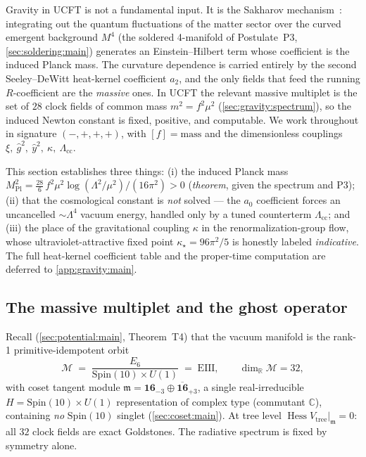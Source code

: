 \documentclass[11pt]{article}
\theoremstyle{plain}
\theoremstyle{definition}
\theoremstyle{remark}
\newcommand{\Hess}{\operatorname{Hess}}
\begin{document}
Gravity in UCFT is not a fundamental input. It is the Sakharov
mechanism~\cite{Sakharov:1967pk}: integrating out the quantum
fluctuations of the matter sector over the curved emergent background
$M^{4}$ (the soldered 4-manifold of Postulate~P3, \autoref{sec:soldering:main})
generates an Einstein--Hilbert term whose coefficient is the induced
Planck mass. The curvature dependence is carried entirely by the
second Seeley--DeWitt heat-kernel coefficient $a_{2}$, and the only
fields that feed the running $R$-coefficient are the \emph{massive}
ones. In UCFT the relevant massive multiplet is the set of
$28$ clock fields of common mass $m^{2}=f^{2}\mu^{2}$
(\autoref{sec:gravity:spectrum}), so the induced Newton constant is
fixed, positive, and computable. We work throughout in signature
$(-,+,+,+)$, with $[f]=\text{mass}$ and the dimensionless couplings
$\xi,\ \hat g^{2},\ \hat y^{2},\ \kappa,\ \Lambda_{\mathrm{cc}}$.

This section establishes three things: (i) the induced Planck mass
$M_{\mathrm{Pl}}^{2}=\tfrac{28}{6}\,f^{2}\mu^{2}\log(\Lambda^{2}/\mu^{2})/(16\pi^{2})>0$
(\emph{theorem}, given the spectrum and P3); (ii) that the
cosmological constant is \emph{not} solved --- the $a_{0}$ coefficient
forces an uncancelled $\sim\Lambda^{4}$ vacuum energy, handled only by a
tuned counterterm $\Lambda_{\mathrm{cc}}$; and (iii) the place of the
gravitational coupling $\kappa$ in the renormalization-group flow, whose
ultraviolet-attractive fixed point $\kappa_{\star}=96\pi^{2}/5$ is honestly
labeled \emph{indicative}. The full heat-kernel coefficient table and the
proper-time computation are deferred to \autoref{app:gravity:main}.

\subsection{The massive multiplet and the ghost operator}
\label{sec:gravity:spectrum}

Recall (\autoref{sec:potential:main}, Theorem~T4) that the vacuum manifold
is the rank-1 primitive-idempotent orbit
\[
  \mathcal M \;=\; \frac{E_{6}}{\mathrm{Spin}(10)\times U(1)} \;=\; \mathrm{EIII},
  \qquad \dim_{\mathbb R}\mathcal M = 32,
\]
with coset tangent module
$\mathfrak m = \mathbf{16}_{-3}\oplus\overline{\mathbf{16}}_{+3}$, a single
real-irreducible $H=\mathrm{Spin}(10)\times U(1)$ representation of complex
type (commutant $\mathbb C$), containing \emph{no} $\mathrm{Spin}(10)$
singlet (\autoref{sec:coset:main}). At tree level
$\Hess V_{\mathrm{tree}}|_{\mathfrak m}=0$: all $32$ clock fields are exact
Goldstones. The radiative spectrum is fixed by symmetry alone.
\end{document}
